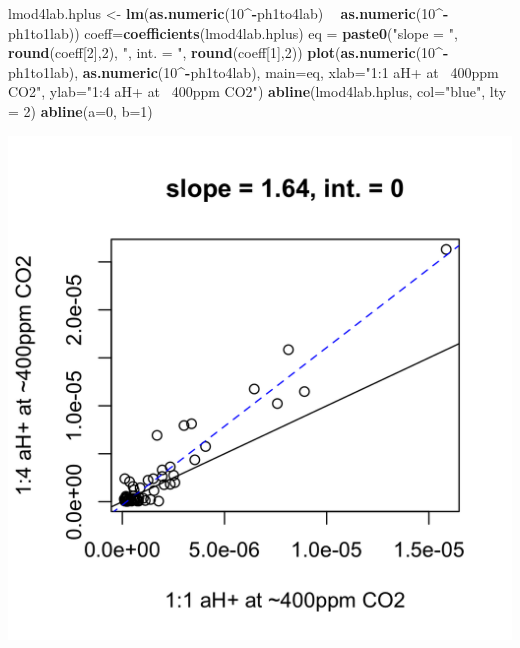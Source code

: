 \documentclass[]{article}
\newenvironment{Shaded}{\begin{snugshade}}{\end{snugshade}}
\newcommand{\DataTypeTok}[1]{\textcolor[rgb]{0.13,0.29,0.53}{#1}}
\newcommand{\DecValTok}[1]{\textcolor[rgb]{0.00,0.00,0.81}{#1}}
\newcommand{\KeywordTok}[1]{\textcolor[rgb]{0.13,0.29,0.53}{\textbf{#1}}}
\newcommand{\NormalTok}[1]{#1}
\newcommand{\OperatorTok}[1]{\textcolor[rgb]{0.81,0.36,0.00}{\textbf{#1}}}
\newcommand{\StringTok}[1]{\textcolor[rgb]{0.31,0.60,0.02}{#1}}
\begin{document}
\begin{Shaded}
\begin{Highlighting}[]
\NormalTok{lmod4lab.hplus <-}\StringTok{ }\KeywordTok{lm}\NormalTok{(}\KeywordTok{as.numeric}\NormalTok{(}\DecValTok{10}\OperatorTok{^-}\NormalTok{ph1to4lab) }\OperatorTok{~}\StringTok{ }\KeywordTok{as.numeric}\NormalTok{(}\DecValTok{10}\OperatorTok{^-}\NormalTok{ph1to1lab))}
\NormalTok{coeff=}\KeywordTok{coefficients}\NormalTok{(lmod4lab.hplus)}
\NormalTok{eq =}\StringTok{ }\KeywordTok{paste0}\NormalTok{(}\StringTok{"slope = "}\NormalTok{, }\KeywordTok{round}\NormalTok{(coeff[}\DecValTok{2}\NormalTok{],}\DecValTok{2}\NormalTok{), }\StringTok{", int. = "}\NormalTok{, }\KeywordTok{round}\NormalTok{(coeff[}\DecValTok{1}\NormalTok{],}\DecValTok{2}\NormalTok{))}
\KeywordTok{plot}\NormalTok{(}\KeywordTok{as.numeric}\NormalTok{(}\DecValTok{10}\OperatorTok{^-}\NormalTok{ph1to1lab), }\KeywordTok{as.numeric}\NormalTok{(}\DecValTok{10}\OperatorTok{^-}\NormalTok{ph1to4lab), }\DataTypeTok{main=}\NormalTok{eq,}
   \DataTypeTok{xlab=}\StringTok{"1:1 aH+ at ~400ppm CO2"}\NormalTok{, }\DataTypeTok{ylab=}\StringTok{"1:4 aH+ at ~400ppm CO2"}\NormalTok{)}
\KeywordTok{abline}\NormalTok{(lmod4lab.hplus, }\DataTypeTok{col=}\StringTok{"blue"}\NormalTok{, }\DataTypeTok{lty =} \DecValTok{2}\NormalTok{)}
\KeywordTok{abline}\NormalTok{(}\DataTypeTok{a=}\DecValTok{0}\NormalTok{, }\DataTypeTok{b=}\DecValTok{1}\NormalTok{)}
\end{Highlighting}
\end{Shaded}

\includegraphics{output-rmd/whitman-figure-request-4-lab-hplus-spooner-1.png}
\end{document}
